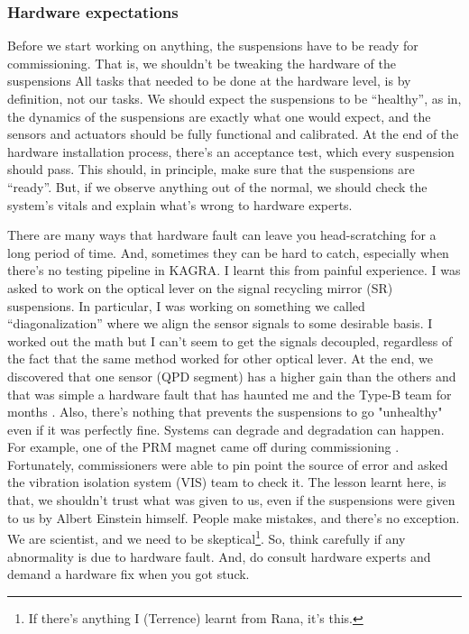 \subsubsection{Hardware expectations}
Before we start working on anything, the suspensions have to be ready for commissioning.
That is, we shouldn't be tweaking the hardware of the suspensions
All tasks that needed to be done at the hardware level, is by definition, not our tasks.
We should expect the suspensions to be ``healthy'', as in, the dynamics of the suspensions are exactly what one would expect, and the sensors and actuators should be fully functional and calibrated.
At the end of the hardware installation process, there's an acceptance test, which every suspension should pass.
This should, in principle, make sure that the suspensions are ``ready''.
But, if we observe anything out of the normal, we should check the system's vitals and explain what's wrong to hardware experts.

There are many ways that hardware fault can leave you head-scratching for a long period of time.
And, sometimes they can be hard to catch, especially when there's no testing pipeline in KAGRA.
I learnt this from painful experience.
I was asked to work on the optical lever on the signal recycling mirror (SR) suspensions.
In particular, I was working on something we called ``diagonalization'' where we align the sensor signals to some desirable basis.
I worked out the math but I can't seem to get the signals decoupled, regardless of the fact that the same method worked for other optical lever.
At the end, we discovered that one sensor (QPD segment) has a higher gain than the others and that was simple a hardware fault that has haunted me and the Type-B team for months \cite{SR2_oplev_diagonalization, Comment_SR2_oplev}.
Also, there's nothing that prevents the suspensions to go "unhealthy" even if it was perfectly fine.
Systems can degrade and degradation can happen.
For example, one of the PRM magnet came off during commissioning \cite{PRM_magnet_came_off, MICH_got_locked}.
Fortunately, commissioners were able to pin point the source of error and asked the vibration isolation system (VIS) team to check it.
The lesson learnt here, is that, we shouldn't trust what was given to us, even if the suspensions were given to us by Albert Einstein himself.
People make mistakes, and there's no exception.
We are scientist, and we need to be skeptical\footnote{If there's anything I (Terrence) learnt from Rana, it's this.}.
So, think carefully if any abnormality is due to hardware fault.
And, do consult hardware experts and demand a hardware fix when you got stuck.

